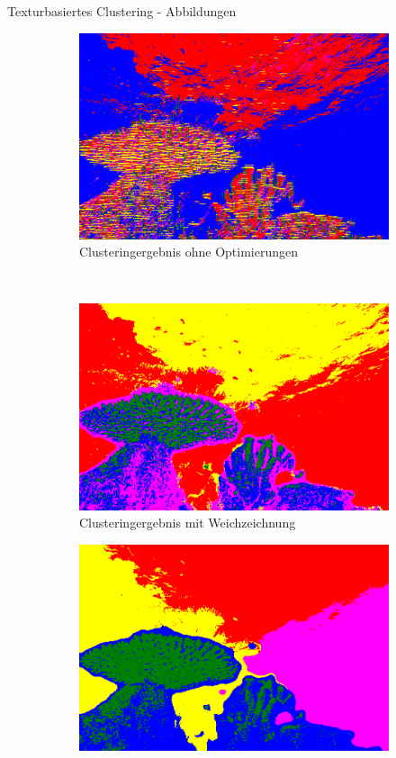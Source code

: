 \documentclass{beamer}
\begin{document}
\begin{frame}{Texturbasiertes Clustering - Abbildungen}
\begin{figure}
\begin{subfigure}[t]{.3\textwidth}
			\includegraphics[width=\textwidth,keepaspectratio]{gfx/101027.jpg_raw.png}
			\caption{Clusteringergebnis ohne Optimierungen}
		\end{subfigure}\\
		\begin{subfigure}[t]{.3\textwidth}
			\includegraphics[width=\textwidth,keepaspectratio]{gfx/101027.jpg_blur.png}
			\caption{Clusteringergebnis mit Weichzeichnung}
		\end{subfigure}
		\hfill
		\begin{subfigure}[t]{.3\textwidth}
			\includegraphics[width=\textwidth,keepaspectratio]{gfx/101027.jpg_blur_norm_spatial.png}

\end{subfigure}
\end{figure}
\end{frame}
\end{document}
